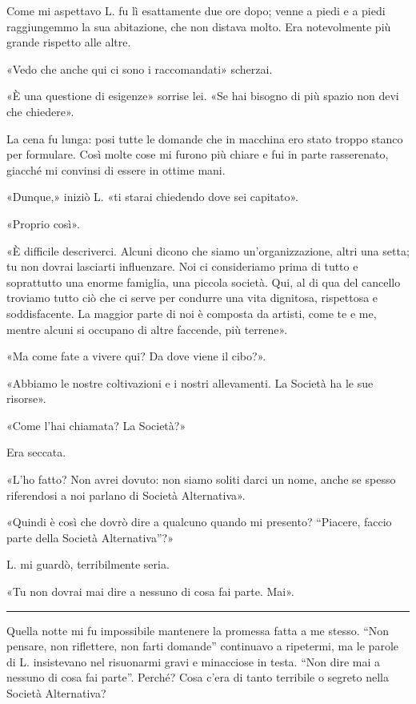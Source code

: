 \documentclass[a4paper,10pt]{memoir}
\begin{document}
Come mi aspettavo L. fu lì esattamente due ore dopo; venne a piedi e a piedi raggiungemmo la sua abitazione, che non
distava molto. Era notevolmente più grande rispetto alle altre.

«Vedo che anche qui ci sono i raccomandati» scherzai.

«È una questione di esigenze» sorrise lei. «Se hai bisogno di più spazio non devi che chiedere».

La cena fu lunga: posi tutte le domande che in macchina ero stato troppo stanco per formulare. Così molte cose mi furono
più chiare e fui in parte rasserenato, giacché mi convinsi di essere in ottime mani.

«Dunque,» iniziò L. «ti starai chiedendo dove sei capitato».

«Proprio così».

«È difficile descriverci. Alcuni dicono che siamo un'organizzazione, altri una setta; tu non dovrai lasciarti
influenzare. Noi ci consideriamo prima di tutto e soprattutto una enorme famiglia, una piccola società. Qui, al di qua
del cancello troviamo tutto ciò che ci serve per condurre una vita dignitosa, rispettosa e soddisfacente. La maggior
parte di noi è composta da artisti, come te e me, mentre alcuni si occupano di altre faccende, più terrene».

«Ma come fate a vivere qui? Da dove viene il cibo?».

«Abbiamo le nostre coltivazioni e i nostri allevamenti. La Società ha le sue risorse».

«Come l'hai chiamata? La Società?»

Era seccata.

«L'ho fatto? Non avrei dovuto: non siamo soliti darci un nome, anche se spesso riferendosi a noi parlano di Società
Alternativa».

«Quindi è così che dovrò dire a qualcuno quando mi presento? ``Piacere, faccio parte della Società Alternativa''?»

L. mi guardò, terribilmente seria.

«Tu non dovrai mai dire a nessuno di cosa fai parte. Mai».

\plainbreak{1}

Quella notte mi fu impossibile mantenere la promessa fatta a me stesso. ``Non pensare, non riflettere, non farti
domande'' continuavo a ripetermi, ma le parole di L. insistevano nel risuonarmi gravi e minacciose in testa. ``Non dire
mai a nessuno di cosa fai parte''. Perché? Cosa c'era di tanto terribile o segreto nella Società Alternativa?
\end{document}
